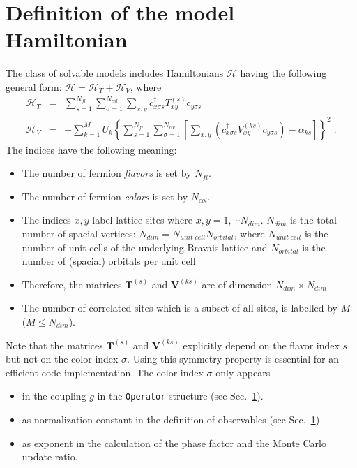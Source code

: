 

\section{Definition of the model Hamiltonian}
The class of solvable models includes  Hamiltonians $\mathcal{H}$ having the following general form:
${\mathcal{H}=\mathcal{H}_{T}+\mathcal{H}_{V}}$, where
\begin{eqnarray}
\label{eqn_general_ham2}
\mathcal{H}_{T}
&=&
\sum\limits_{s=1}^{N_{fl}}
\sum\limits_{\sigma=1}^{N_{col}}
\sum\limits_{x,y}
c^{\dagger}_{x \sigma   s}T_{xy}^{(s)} c^{\phantom\dagger}_{y \sigma s}\\
\mathcal{H}_{V}
&=&
-
\sum\limits_{k=1}^{M}U_{k}
\left\{
\sum\limits_{s=1}^{N_{fl}}
\sum\limits_{\sigma=1}^{N_{col}}
\left[
\sum\limits_{x,y}
\left(
c^{\dagger}_{x \sigma s}V_{xy}^{(k s)}c^{\phantom\dagger}_{y \sigma s}
\right)
-\alpha_{k s} 
\right]
\right\}^{2}\;.
\end{eqnarray}
The indices have the following meaning:
\begin{itemize}
\item The number of fermion \textit{flavors} is set by $N_{fl}$. 
\item The number of fermion \textit{colors} is set by $N_{col}$. 
\item The indices $x,y$ label lattice sites where $x,y=1,\cdots N_{dim}$. 
$N_{dim}$ is the total number of spacial vertices: $N_{dim}=N_{unit\;cell} N_{orbital}$, where $N_{unit\;cell}$ is the number of unit cells of the underlying Bravais lattice and $N_{orbital}$ is the number of (spacial) orbitals per unit cell  
\item Therefore, the  matrices $\bm{T}^{(s)}$ and $\bm{V}^{(ks)}$ are  of dimension $N_{dim}\times N_{dim}$
\item The number of correlated sites which is a subset of all sites, is labelled by $M$  ($M\leq N_{dim}$).
\end{itemize}
Note that the matrices  $\bm{T}^{(s)}$ and $\bm{V}^{(ks)}$ explicitly depend on the flavor index $s$ but not on the color index $\sigma$. 
Using this symmetry property is essential for an efficient code implementation. The color index $\sigma$ only appears 
\begin{itemize}
\item in the coupling $g$ in the \texttt{Operator} structure (see Sec.~\ref{}).
\item as normalization constant in the definition of observables (see Sec.~\ref{})
\item as exponent in the calculation of the phase factor and the Monte Carlo update ratio.
\end{itemize}




